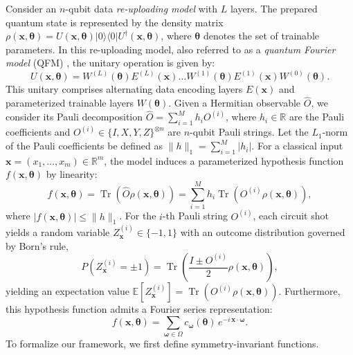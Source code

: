 \documentclass[%
 reprint,
 amsmath,amssymb,
 aps,
 pra,
]{revtex4-2}
\theoremstyle{definition}
\begin{document}
Consider an \(n\)-qubit data \textit{re-uploading model} \cite{Adrian2020,Schuld2021Effect} with \(L\) layers. The prepared quantum state is represented by the density matrix \(\rho(\bm{x}, \bm{\theta}) = U(\bm{x}, \bm{\theta})|0\rangle\langle0|U^\dagger(\bm{x}, \bm{\theta})\), where \(\bm{\theta}\) denotes the set of trainable parameters. In this re-uploading model, also referred to as a \textit{quantum Fourier model} (QFM) \cite{Hela2025}, the unitary operation is given by:
\begin{equation}
\label{eq:reupload}
U(\bm{x}, \bm{\theta}) = W^{(L)}(\bm{\theta}) E^{(L)}(\bm{x}) \dots W^{(1)}(\bm{\theta}) E^{(1)}(\bm{x}) W^{(0)}(\bm{\theta}).
\end{equation}
This unitary comprises alternating data encoding layers \(E(\bm{x})\) and parameterized trainable layers \(W(\bm{\theta})\). Given a Hermitian observable \(\hat{O}\), we consider its Pauli decomposition \(\hat{O} = \sum_{i=1}^{M} h_i O^{(i)}\), where \(h_i \in \mathbb{R}\) are the Pauli coefficients and \(O^{(i)} \in \{I, X, Y, Z\}^{\otimes n}\) are \(n\)-qubit Pauli strings. Let the \(L_1\)-norm of the Pauli coefficients be defined as \(\|h\|_1=\sum_{i=1}^M|h_i|\). For a classical input \(\bm{x} = (x_1, \dots, x_m) \in \mathbb{R}^m\), the model induces a parameterized hypothesis function \(f(\bm{x}, \bm{\theta})\) by linearity:
\begin{equation}
\label{eq:re-uploading_function}
f(\bm{x}, \bm{\theta}) = \operatorname{Tr}(\hat{O} \rho(\bm{x}, \bm{\theta})) = \sum_{i=1}^{M} h_i \operatorname{Tr}(O^{(i)} \rho(\bm{x}, \bm{\theta})),
\end{equation}
where \(|f(\bm{x}, \bm{\theta})| \leq\|h\|_1\). For the \(i\)-th Pauli string \(O^{(i)}\), each circuit shot yields a random variable \(Z^{(i)}_{\bm{x}} \in \{-1, 1\}\) with an outcome distribution governed by Born's rule,
\begin{equation}
P\left(Z^{(i)}_{\bm{x}} = \pm 1\right)
= \operatorname{Tr}\left( \frac{I \pm O^{(i)}}{2} \rho(\bm{x}, \bm{\theta}) \right),
\end{equation}
yielding an expectation value \(\mathbb{E}[Z^{(i)}_{\bm{x}}] = \operatorname{Tr}(O^{(i)} \rho(\bm{x}, \bm{\theta}))\). Furthermore, this hypothesis function admits a Fourier series representation:
\begin{equation}
\label{eq:QFM}
f(\bm{x}, \bm{\theta}) = \sum_{\bm{\omega}\in\Omega} c_{\bm{\omega}}(\bm{\theta})\, e^{-i\,\bm{x}\cdot\bm{\omega}}.
\end{equation}
To formalize our framework, we first define symmetry-invariant functions.
\end{document}
